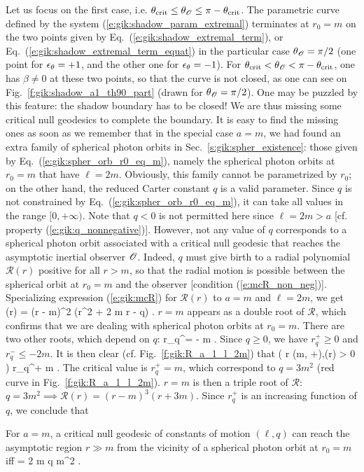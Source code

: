 Let us focus on the first case, i.e. $\theta_{\rm crit} \leq \theta_{\mathscr{O}} \leq \pi - \theta_{\rm crit}$.
The parametric curve defined by
the system (\ref{e:gik:shadow_param_extremal}) terminates at $r_0 = m$ on the two points
given by Eq.~(\ref{e:gik:shadow_extremal_term}), or Eq.~(\ref{e:gik:shadow_extremal_term_equat})
in the particular case $\theta_{\mathscr{O}} = \pi/2$ (one point for $\epsilon_\theta=+1$, and the other one
for $\epsilon_\theta=-1$). For $\theta_{\rm crit} < \theta_{\mathscr{O}} < \pi - \theta_{\rm crit}$, one has
$\beta \neq 0$ at these two points, so that the curve is not closed, as one can see
on Fig.~\ref{f:gik:shadow_a1_th90_part} (drawn for $\theta_{\mathscr{O}} = \pi/2$).
One may be puzzled by this feature: the shadow boundary has to be closed!
We are thus missing some critical null geodesics to complete the boundary.
It is easy to find the missing ones as soon as we remember that in the
special case $a=m$, we had found an extra family of spherical photon orbits
in Sec.~\ref{s:gik:spher_existence}: those given by Eq.~(\ref{e:gik:spher_orb_r0_eq_m}),
namely the spherical photon orbits at $r_0 = m$ that have
$\ell = 2m$. Obviously, this family cannot be parametrized by $r_0$; on the other hand,
the reduced Carter constant $q$ is a valid parameter. Since $q$ is
not constrained by Eq.~(\ref{e:gik:spher_orb_r0_eq_m}), it can take all
values in the range $[0, +\infty)$. Note that $q<0$ is not permitted here
since $\ell = 2 m > a$ [cf. property (\ref{e:gik:q_nonnegative})].
However, not any value of $q$ corresponds to a spherical photon orbit associated
with a critical null geodesic that reaches the asymptotic inertial observer $\mathscr{O}$.
Indeed, $q$ must give birth to a radial polynomial
$\mathcal{R}(r)$ positive for all $r > m$, so that the radial
motion is possible between the spherical orbit at $r_0=m$
 and the observer [condition (\ref{e:mcR_non_neg})].
Specializing expression (\ref{e:gik:mcR}) for $\mathcal{R}(r)$ to $a=m$ and $\ell=2m$,
we get
\be
    (r) = (r - m)^2 (r^2 + 2 m r - q) .
\ee
$r = m$ appears as a double root of $\mathcal{R}$, which confirms that we are dealing
with spherical photon orbits at $r_0 = m$. There are two other roots, which depend
on $q$:
\be \label{e:gik:root_rq}
    r_q^\pm = \pm {} - m .
\ee
Since $q\geq 0$, we have $r_q^+ \geq 0$ and $r_q^- \leq - 2m$.
It is then clear (cf. Fig.~\ref{f:gik:R_a_1_l_2m}) that
\be
     \left( \forall r \in (m, +\infty),\quad  {}(r) > 0 \right) \iff r_q^+ \leq m .
\ee
The critical value is $r_q^+ = m$, which correspond to $q = 3 m^2$ (red curve
in Fig.~\ref{f:gik:R_a_1_l_2m}). $r=m$ is then a triple root of $\mathcal{R}$:
$q = 3 m^2 \implies \mathcal{R}(r) = ( r - m)^3 (r + 3m)$. Since $r_q^+$
is an increasing function of $q$, we conclude that
\begin{greybox}
For $a=m$, a critical null geodesic
of constants of motion $(\ell, q)$ can reach the asymptotic region $r\gg m$
from the vicinity of a spherical photon orbit at $r_0 = m$ iff
\be \label{e:gik:critical_from_NHEK}
    \ell = 2 m  \leq q  m^2 .
\ee
\end{greybox}

